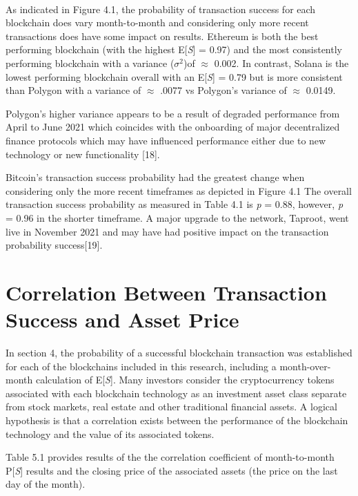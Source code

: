 \documentclass[12pt]{article}
\begin{document}
\\
As indicated in Figure 4.1, the probability of transaction success for each blockchain does vary month-to-month and considering only more recent transactions does have some impact on results. Ethereum is both the best performing blockchain (with the highest E[\emph{S}] = 0.97) and the most consistently performing blockchain with a variance ($\sigma^{2}$)of $\approx$ 0.002. In contrast, Solana is the lowest performing blockchain overall with an E[\emph{S}] = 0.79 but is more consistent than Polygon with a variance of $\approx$ .0077 vs Polygon's variance of $\approx$ 0.0149. 

Polygon's higher variance appears to be a result of degraded performance from April to June 2021 which coincides with the onboarding of major decentralized finance protocols which may have influenced performance either due to new technology or new functionality [18].

Bitcoin's transaction success probability had the greatest change when considering only the more recent timeframes as depicted in Figure 4.1 The overall transaction success probability as measured in Table 4.1 is \emph{p} = 0.88, however, \emph{p} = 0.96 in the shorter timeframe. A major upgrade to the network, Taproot, went live in November 2021 and may have had  positive impact on the transaction probability success[19].

\section{Correlation Between Transaction Success and Asset Price}
In section 4, the probability of a successful blockchain transaction was established for each of the blockchains included in this research, including a month-over-month calculation of E[\emph{S}]. Many investors consider the cryptocurrency tokens associated with each blockchain technology as an investment asset class separate from stock markets, real estate and other traditional financial assets. A logical hypothesis is that a correlation exists between the performance of the blockchain technology and the value of its associated tokens.

Table 5.1 provides results of the the correlation coefficient of month-to-month P[\emph{S}] results and the closing price of the associated assets (the price on the last day of the month).\\
\end{document}
